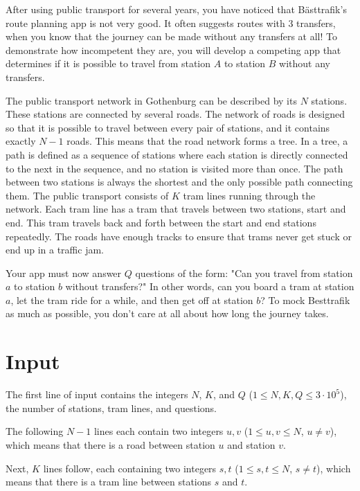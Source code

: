 
\noindent
After using public transport for several years, you have noticed that Bästtrafik's route planning app is not very good.
It often suggests routes with 3 transfers, when you know that the journey can be made without any transfers at all!
To demonstrate how incompetent they are, you will develop a competing app that determines if it is possible to travel
from station $A$ to station $B$ without any transfers.

The public transport network in Gothenburg can be described by its $N$ stations. 
These stations are connected by several roads. 
The network of roads is designed so that it is possible to travel between every pair of stations, and it contains
exactly $N-1$ roads. This means that the road network forms a tree. In a tree, a path is defined as a sequence of
stations where each station is directly connected to the next in the sequence, and no station is visited more than
once. The path between two stations is always the shortest and the only possible path connecting them. The public
transport consists of $K$ tram lines running through the network. Each tram line has a tram that travels between
two stations, start and end. This tram travels back and forth between the start and end stations repeatedly. The
roads have enough tracks to ensure that trams never get stuck or end up in a traffic jam.

Your app must now answer $Q$ questions of the form: "Can you travel from station $a$ to station $b$
without transfers?" In other words, can you board a tram at station $a$, let the tram ride for a while, and then
get off at station $b$? To mock Besttrafik as much as possible, you don't care at all about how long the journey takes.

\section*{Input}
The first line of input contains the integers $N$, $K$, and $Q$ ($1 \le N, K, Q \le 3 \cdot 10^5$),
the number of stations, tram lines, and questions.

The following $N-1$ lines each contain two integers $u,v$ ($1 \leq u,v \leq N$, $u \neq v$),
which means that there is a road between station $u$ and station $v$. 

Next, $K$ lines follow, each containing two integers $s,t$ ($1 \leq s,t \leq N$, $s \neq t$), which
means that there is a tram line between stations $s$ and $t$.

